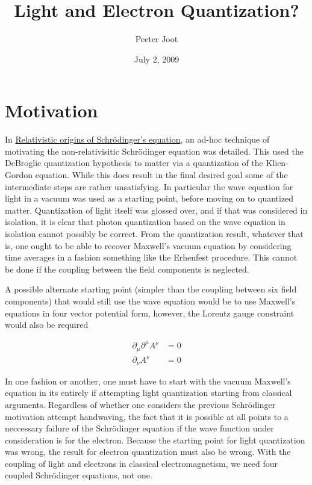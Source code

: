 \documentclass[]{eliblog}
\title{Light and Electron Quantization?}
\author{Peeter Joot}
\date{July 2, 2009}
\begin{document}
\maketitle{}
\tableofcontents
\section{Motivation}

In \href{http://sites.google.com/site/peeterjoot/math2009/relwave.pdf}{Relativistic origins of Schr\"odinger's equation}, an ad-hoc technique of motivating the non-relativisitic Schr\"odinger equation was detailed.  This used the DeBroglie quantization hypothesis to matter via a quantization of the Klien-Gordon equation.  While this  does result in the final desired goal some of the intermediate steps are rather unsatisfying.  In particular the wave equation for light in a vacuum was used as a starting point, before moving on to quantized matter.  Quantization of light itself was glossed over, and if that was considered in isolation, it is clear that photon quantization based on the wave equation in isolation cannot possibly be correct.  From the quantization result, whatever that is, one ought to be able to recover Maxwell's vacuum equation by considering time averages in a fashion something like the Erhenfest procedure.  This cannot be done if the coupling between the field components is neglected.

A possible alternate starting point (simpler than the coupling between six field components) that would still use the wave equation would be to use Maxwell's equations in four vector potential form, however, the Lorentz gauge constraint would also be required

\begin{align}\label{eqn:maxwellPotVacuum}
\partial_\mu \partial^\mu A^\nu &= 0 \\
\partial_\nu A^\nu &= 0
\end{align}

In one fashion or another, one must have to start with the vacuum Maxwell's equation in its entirely if attempting light quantization starting from classical arguments.  Regardless of whether one considers the previous Schr\"odinger motivation attempt handwaving, the fact that it is possible at all points to a neccessary failure of the Schr\"odinger equation if the wave function under consideration is for the electron.  Because the starting point for light quantization was wrong, the result for electron quantization must also be wrong.  With the coupling of light and electrons in classical electromagnetism, we need four coupled Schr\"odinger equations, not one.  
\end{document}
